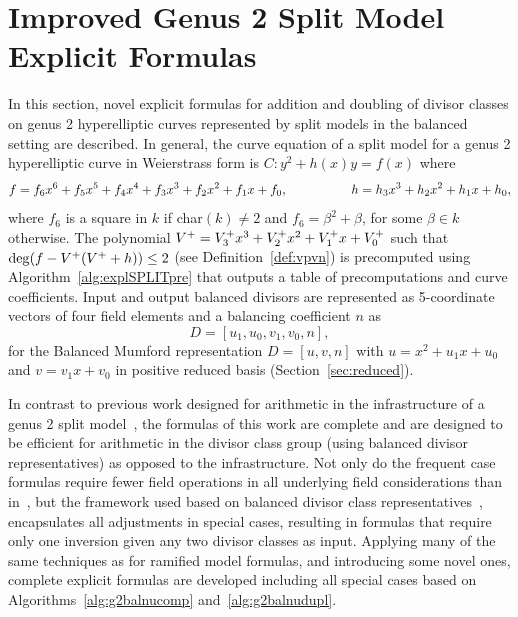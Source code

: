 \section{Improved Genus 2 Split Model Explicit Formulas}
\label{sec:g2splitExpl}

In this section, novel explicit formulas for addition and doubling of divisor
classes on genus 2 hyperelliptic curves represented by split models in the
balanced setting are described. In general, the curve equation of a split model
for a genus 2 hyperelliptic curve in Weierstrass form is $C: y^2 + h(x)y = f(x)$
where
$$f = f_6x^6 + f_5x^5 + f_4x^4 + f_3x^3 + f_2 x^2 + f_1x + f_0, \quad\quad\quad\quad\quad h =
h_3x^3 + h_2x^2 + h_1x + h_0,$$ where $f_6$ is a square in $k$ if char$(k) \neq
2$ and $f_6 = \beta^2 + \beta$, for some $\beta \in k$ otherwise. The polynomial
$V^{+} = V^{+}_3x^3 + V^{+}_2x^2 + V^{+}_1x + V^{+}_0$ such that $\deg(f - V^{+}(V^{+} + h))
\leq 2$ (see Definition~\ref{def:vpvn}) is precomputed using
Algorithm~\ref{alg:explSPLITpre} that outputs a table of precomputations and
curve coefficients. Input and output balanced divisors are represented as
5-coordinate vectors of four field elements and a balancing coefficient $n$ as$$
D = [u_1,u_0,v_1,v_0,n],$$ for the Balanced Mumford representation $D = [u,v,n]$
with $u = x^2 + u_1x + u_0$ and $v = v_1x + v_0$ in positive reduced basis
(Section~\ref{sec:reduced}).  

In contrast to previous work designed for arithmetic in the infrastructure of a
genus 2 split model~\cite{EricksonJacobsonStein_realg2_2011}, the formulas of
this work are complete and are designed to be efficient for arithmetic in the
divisor class group (using balanced divisor representatives) as opposed to the
infrastructure. Not only do the frequent case formulas require fewer field
operations in all underlying field considerations than
in~\cite{EricksonJacobsonStein_realg2_2011}, but the framework used based on
balanced divisor class representatives~\cite{Galbraith_balanced_2008},
encapsulates all adjustments in special cases, resulting in formulas that
require only one inversion given any two divisor classes as input. Applying many
of the same techniques as for ramified model formulas, and introducing some
novel ones, complete explicit formulas are developed including all special cases
based on Algorithms~\ref{alg:g2balnucomp} and~\ref{alg:g2balnudupl}.

